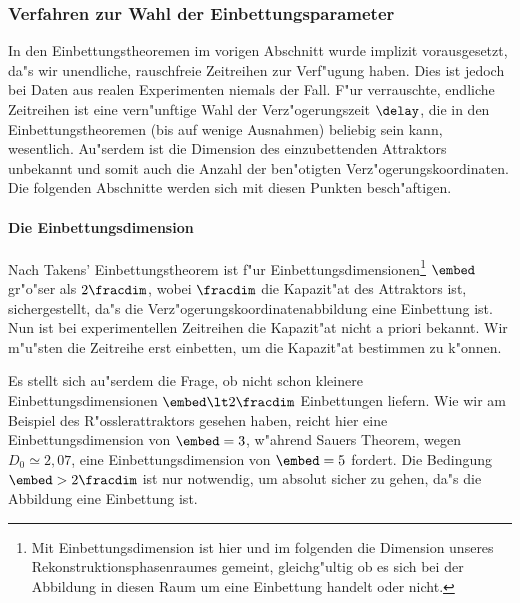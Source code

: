 
\subsubsection{Verfahren zur Wahl der Einbettungsparameter}

In den Einbettungstheoremen im vorigen Abschnitt wurde implizit vorausgesetzt, da"s wir
unendliche, rauschfreie Zeitreihen zur Verf"ugung haben. Dies ist jedoch bei Daten aus
realen Experimenten niemals der Fall. F"ur verrauschte, endliche Zeitreihen ist eine
vern"unftige Wahl der Verz"ogerungszeit $\delay$, die in den Einbettungstheoremen (bis auf
wenige Ausnahmen) beliebig sein kann, wesentlich. Au"serdem ist die Dimension des
einzubettenden Attraktors unbekannt und somit auch die Anzahl der ben"otigten
Verz"ogerungskoordinaten. Die folgenden Abschnitte werden sich mit diesen Punkten
besch"aftigen.


\paragraph{Die Einbettungsdimension}

Nach Takens' Einbettungstheorem ist f"ur Einbettungsdimensionen\footnote{Mit
  Einbettungsdimension ist hier und im folgenden die Dimension unseres
  Rekonstruktionsphasenraumes gemeint, gleichg"ultig ob es sich bei der Abbildung in
  diesen Raum um eine Einbettung handelt oder nicht.} $\embed$ gr"o"ser als $2\fracdim$,
wobei $\fracdim$ die Kapazit"at des Attraktors ist, sichergestellt, da"s die
Verz"ogerungskoordinatenabbildung eine Einbettung ist. Nun ist bei experimentellen
Zeitreihen die Kapazit"at nicht a priori bekannt. Wir m"u"sten die Zeitreihe erst
einbetten, um die Kapazit"at bestimmen zu k"onnen.

Es stellt sich au"serdem die Frage, ob nicht schon kleinere Einbettungsdimensionen
$\embed\lt 2\fracdim$ Einbettungen liefern. Wie wir am Beispiel des R"osslerattraktors
gesehen haben, reicht hier eine Einbettungsdimension von $\embed=3$, w"ahrend Sauers
Theorem, wegen $D_0\simeq2,07$, eine Einbettungsdimension von $\embed=5$ fordert. Die
Bedingung $\embed>2\fracdim$ ist nur notwendig, um absolut sicher zu gehen, da"s die
Abbildung eine Einbettung ist.

